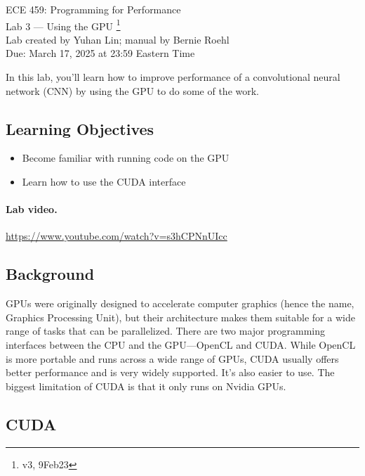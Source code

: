 



\begin{center}
{\Large ECE 459: Programming for Performance}\\
{\Large Lab 3 --- Using the GPU \footnote{v3, 9Feb23}}\\[1em]
Lab created by Yuhan Lin; manual by Bernie Roehl\\
Due: March 17, 2025 at 23:59 Eastern Time
\end{center}

In this lab, you'll learn how to improve performance of a convolutional neural network (CNN) by using the GPU to do some of the work.


\subsection*{Learning Objectives}

\begin{itemize}[noitemsep]
	\item Become familiar with running code on the GPU

	\item Learn how to use the CUDA interface
\end{itemize}

\paragraph{Lab video.} \url{https://www.youtube.com/watch?v=s3hCPNnUIcc}

\subsection*{Background}

GPUs were originally designed to accelerate computer graphics (hence the name, Graphics Processing Unit), but their architecture makes them suitable for a wide range of tasks that can be parallelized. There are two major programming interfaces between the CPU and the GPU---OpenCL and CUDA. While OpenCL is more portable and runs across a wide range of GPUs, CUDA usually offers better performance and is very widely supported. It's also easier to use. The biggest limitation of CUDA is that it only runs on Nvidia GPUs.

\subsection*{CUDA}

